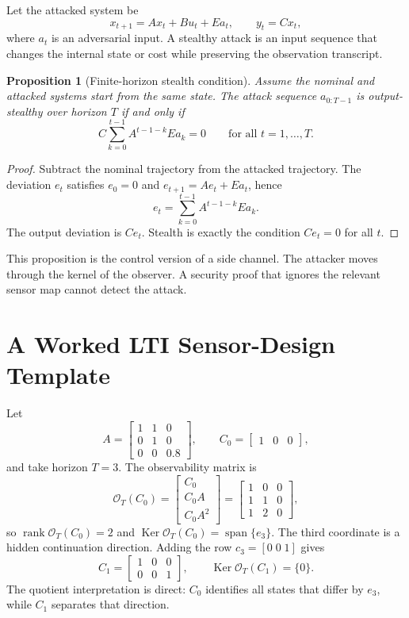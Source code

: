 \documentclass[11pt]{article}
\theoremstyle{definition}
\theoremstyle{plain}
\newtheorem{proposition}[definition]{Proposition}
\theoremstyle{remark}
\DeclareMathOperator{\Ker}{Ker}
\DeclareMathOperator{\rank}{rank}
\begin{document}
Let the attacked system be
\[
    x_{t+1}=Ax_t+Bu_t+Ea_t,\qquad y_t=Cx_t,
\]
where $a_t$ is an adversarial input. A stealthy attack is an input sequence that changes the internal state or cost while preserving the observation transcript.

\begin{proposition}[Finite-horizon stealth condition]
Assume the nominal and attacked systems start from the same state. The attack sequence $a_{0:T-1}$ is output-stealthy over horizon $T$ if and only if
\[
    C\sum_{k=0}^{t-1}A^{t-1-k}Ea_k=0\qquad \text{for all }t=1,\ldots,T.
\]
\end{proposition}

\begin{proof}
Subtract the nominal trajectory from the attacked trajectory. The deviation $e_t$ satisfies $e_0=0$ and $e_{t+1}=Ae_t+Ea_t$, hence
\[
    e_t=\sum_{k=0}^{t-1}A^{t-1-k}Ea_k.
\]
The output deviation is $Ce_t$. Stealth is exactly the condition $Ce_t=0$ for all $t$.
\end{proof}

This proposition is the control version of a side channel. The attacker moves through the kernel of the observer. A security proof that ignores the relevant sensor map cannot detect the attack.



\section{A Worked LTI Sensor-Design Template}
\label{sec:lti-example}

Let
\[
A=\begin{bmatrix}1&1&0\\0&1&0\\0&0&0.8\end{bmatrix},\qquad
C_0=\begin{bmatrix}1&0&0\end{bmatrix},
\]
and take horizon $T=3$. The observability matrix is
\[
\mathcal O_T(C_0)=\begin{bmatrix}C_0\\C_0A\\C_0A^2\end{bmatrix}
=\begin{bmatrix}1&0&0\\1&1&0\\1&2&0\end{bmatrix},
\]
so $\rank\mathcal O_T(C_0)=2$ and $\Ker\mathcal O_T(C_0)=\operatorname{span}\{e_3\}$. The third coordinate is a hidden continuation direction. Adding the row $c_3=[0\;0\;1]$ gives
\[
C_1=\begin{bmatrix}1&0&0\\0&0&1\end{bmatrix},
\qquad \Ker\mathcal O_T(C_1)=\{0\}.
\]
The quotient interpretation is direct: $C_0$ identifies all states that differ by $e_3$, while $C_1$ separates that direction.
\end{document}

